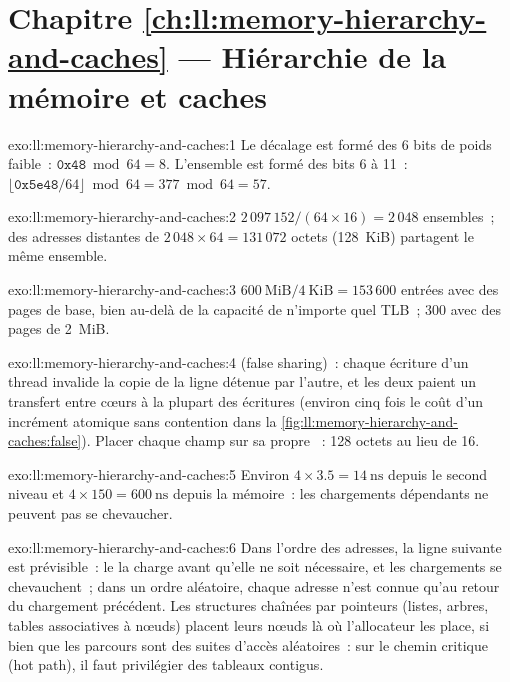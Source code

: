 \section*{Chapitre \ref{ch:ll:memory-hierarchy-and-caches} --- Hiérarchie de la mémoire et caches}

\begin{solution}{exo:ll:memory-hierarchy-and-caches:1}
Le décalage est formé des 6 bits de poids faible~: $\texttt{0x48} \bmod 64 = 8$. L'ensemble est formé des bits 6 à 11~: $\lfloor\texttt{0x5e48}/64\rfloor
\bmod 64 = 377 \bmod 64 = 57$.
\end{solution}

\begin{solution}{exo:ll:memory-hierarchy-and-caches:2}
$2\,097\,152 / (64 \times 16) = 2\,048$ ensembles~; des adresses distantes de $2\,048 \times 64 = 131\,072$ octets (128~KiB) partagent le même ensemble.
\end{solution}

\begin{solution}{exo:ll:memory-hierarchy-and-caches:3}
$600~\text{MiB}/4~\text{KiB} = 153\,600$ entrées avec des pages de base, bien au-delà de la capacité de n'importe quel TLB~; 300 avec des pages de 2~MiB.
\end{solution}

\begin{solution}{exo:ll:memory-hierarchy-and-caches:4}
 (false sharing)~: chaque écriture d'un thread invalide la copie de la ligne détenue par l'autre, et les deux paient un transfert entre cœurs
à la plupart des écritures (environ cinq fois le coût d'un incrément atomique sans contention dans la
\cref{fig:ll:memory-hierarchy-and-caches:false}). Placer chaque champ sur sa propre ~: 128 octets au lieu de 16.
\end{solution}

\begin{solution}{exo:ll:memory-hierarchy-and-caches:5}
Environ $4 \times 3.5 = \qty{14}{\nano\second}$ depuis le second niveau et $4 \times 150 = \qty{600}{\nano\second}$ depuis
la mémoire~: les chargements dépendants ne peuvent pas se chevaucher.
\end{solution}

\begin{solution}{exo:ll:memory-hierarchy-and-caches:6}
Dans l'ordre des adresses, la ligne suivante est prévisible~: le  la charge avant qu'elle ne soit nécessaire, et les chargements se chevauchent~;
dans un ordre aléatoire, chaque adresse n'est connue qu'au retour du chargement précédent. Les structures chaînées par pointeurs (listes, arbres,
tables associatives à nœuds) placent leurs nœuds là où l'allocateur les place, si bien que les parcours sont des suites d'accès aléatoires~: sur le chemin critique (hot path), il faut privilégier
des tableaux contigus.
\end{solution}

